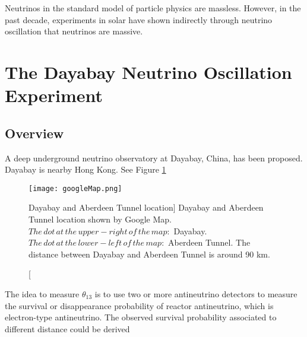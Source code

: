 Neutrinos in the standard model of particle physics are massless.
However, in the past decade, experiments \cite{Fkuda:1998} \cite{SNO:2001} in solar have shown indirectly through neutrino oscillation 
that neutrinos are massive.




%
%
%
%
%
%





\section{The Dayabay Neutrino Oscillation Experiment}
\subsection{Overview}

A deep underground neutrino observatory at Dayabay, China, has
been proposed. \cite{TDR}
Dayabay is nearby Hong Kong. See Figure \ref{fig:googleMap.png}


\begin{figure}
    \label{fig:googleMap.png}
    \centering
    \texttt{[image: googleMap.png]}
    \caption
    [Dayabay and Aberdeen Tunnel location]
    {Dayabay and Aberdeen Tunnel location shown by Google Map.
$The\,dot\,at\,the\,upper-right\,of\,the\,map:$ Dayabay.
$The\,dot\,at\,the\,lower-left\,of\,the\,map:$ Aberdeen Tunnel.
The distance between Dayabay and Aberdeen Tunnel is around 90 km.}
    \end{figure}


The idea to measure $\theta_{13}$ is to use two or more antineutrino detectors
to measure the survival or disappearance probability of reactor antineutrino, which is electron-type antineutrino.
The observed survival probability associated to different distance could be derived 


